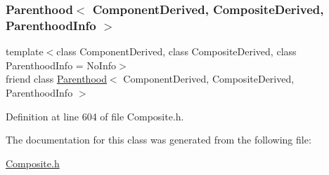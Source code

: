 \subsubsection{\texorpdfstring{Parenthood$<$ Component\+Derived, Composite\+Derived, Parenthood\+Info $>$}{Parenthood< ComponentDerived, CompositeDerived, ParenthoodInfo >}}
{\footnotesize\ttfamily template$<$class Component\+Derived, class Composite\+Derived, class Parenthood\+Info = No\+Info$>$ \\
friend class \hyperlink{classocra_1_1Parenthood}{Parenthood}$<$ Component\+Derived, Composite\+Derived, Parenthood\+Info $>$\hspace{0.3cm}{\ttfamily [friend]}}



Definition at line 604 of file Composite.\+h.



The documentation for this class was generated from the following file\+:\begin{DoxyCompactItemize}
\item 
\hyperlink{Composite_8h}{Composite.\+h}\end{DoxyCompactItemize}
